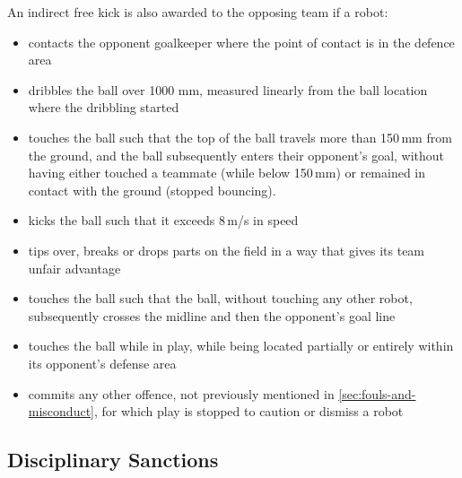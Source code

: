 An indirect free kick is also awarded to the opposing team if a robot:
\begin{itemize}
\item contacts the opponent goalkeeper where the point of contact is in the defence area
\item dribbles the ball over 1000 mm, measured linearly from the ball location where the
dribbling started
\item touches the ball such that the top of the ball travels more than 150\,mm from the ground, and the ball subsequently enters their opponent's goal, without having either touched a teammate (while below 150\,mm) or remained in contact with the ground (stopped bouncing).
\item kicks the ball such that it exceeds 8\,m/s in speed
\item tips over, breaks or drops parts on the field in a way that gives its team unfair advantage
\item touches the ball such that the ball, without touching any other
  robot, subsequently crosses the  midline and then the opponent's goal line
\item touches the ball while in play, while being located partially or
entirely within its opponent's defense area
\item commits any other offence, not previously mentioned in \autoref{sec:fouls-and-misconduct}, for which play is stopped to caution or dismiss a robot
\end{itemize}

\subsection{Disciplinary Sanctions}\label{subsec:fouls-and-misconduct-disciplinary-sanctions}
